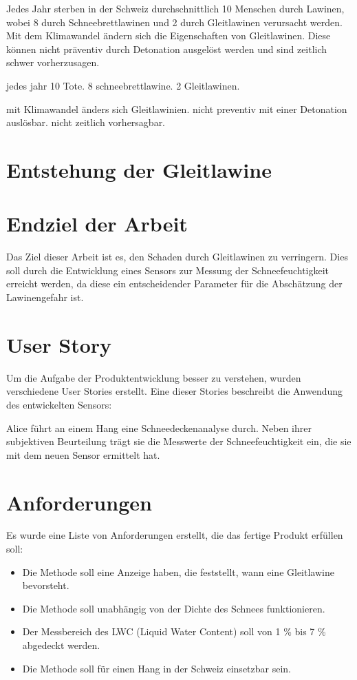 

Jedes Jahr sterben in der Schweiz durchschnittlich 10 Menschen durch Lawinen, wobei 8 durch Schneebrettlawinen und 2 durch Gleitlawinen verursacht werden. Mit dem Klimawandel ändern sich die Eigenschaften von Gleitlawinen. Diese können nicht präventiv durch Detonation ausgelöst werden und sind zeitlich schwer vorherzusagen.

\iffalse
jedes jahr 10 Tote. 8 schneebrettlawine. 2 Gleitlawinen.

mit Klimawandel änders sich Gleitlawinien. nicht preventiv mit einer Detonation auslösbar. nicht zeitlich vorhersagbar.


\section{Entstehung der Gleitlawine}



\section{Endziel der Arbeit}

Das Ziel dieser Arbeit ist es, den Schaden durch Gleitlawinen zu verringern. Dies soll durch die Entwicklung eines Sensors zur Messung der Schneefeuchtigkeit erreicht werden, da diese ein entscheidender Parameter für die Abschätzung der Lawinengefahr ist.

\section{User Story}

Um die Aufgabe der Produktentwicklung besser zu verstehen, wurden verschiedene User Stories erstellt. Eine dieser Stories beschreibt die Anwendung des entwickelten Sensors:

Alice führt an einem Hang eine Schneedeckenanalyse durch. Neben ihrer subjektiven Beurteilung trägt sie die Messwerte der Schneefeuchtigkeit ein, die sie mit dem neuen Sensor ermittelt hat.

\section{Anforderungen}

Es wurde eine Liste von Anforderungen erstellt, die das fertige Produkt erfüllen soll:
\begin{itemize}
    \item Die Methode soll eine Anzeige haben, die feststellt, wann eine Gleitlawine bevorsteht.
    \item Die Methode soll unabhängig von der Dichte des Schnees funktionieren.
    \item Der Messbereich des LWC (Liquid Water Content) soll von 1 \% bis 7 \% abgedeckt werden.
    \item Die Methode soll für einen Hang in der Schweiz einsetzbar sein.
\end{itemize}

